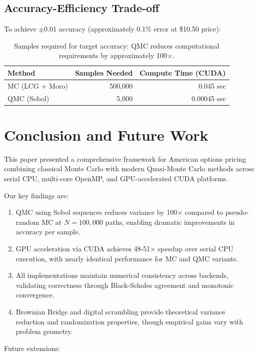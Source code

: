 \documentclass[11pt,a4paper]{article}
\begin{document}
\subsection{Accuracy-Efficiency Trade-off}

To achieve $\pm 0.01$ accuracy (approximately 0.1\% error at \$10.50 price):

\begin{table}[H]
\centering
\begin{tabular}{lrr}
\toprule
\textbf{Method} & \textbf{Samples Needed} & \textbf{Compute Time (CUDA)} \\
\midrule
MC (LCG + Moro) & 500,000 & 0.045 sec \\
QMC (Sobol) & 5,000 & 0.00045 sec \\
\bottomrule
\end{tabular}
\caption{Samples required for target accuracy: QMC reduces computational requirements by approximately 100×.}
\end{table}

\section{Conclusion and Future Work}\label{sec:conclusion}

This paper presented a comprehensive framework for American options pricing combining classical Monte Carlo with modern Quasi-Monte Carlo methods across serial CPU, multi-core OpenMP, and GPU-accelerated CUDA platforms.

Our key findings are:

\begin{enumerate}
    \item QMC using Sobol sequences reduces variance by 100× compared to pseudo-random MC at $N=100{,}000$ paths, enabling dramatic improvements in accuracy per sample.
    \item GPU acceleration via CUDA achieves 48-51× speedup over serial CPU execution, with nearly identical performance for MC and QMC variants.
    \item All implementations maintain numerical consistency across backends, validating correctness through Black-Scholes agreement and monotonic convergence.
    \item Brownian Bridge and digital scrambling provide theoretical variance reduction and randomization properties, though empirical gains vary with problem geometry.
\end{enumerate}

Future extensions:
\end{document}
